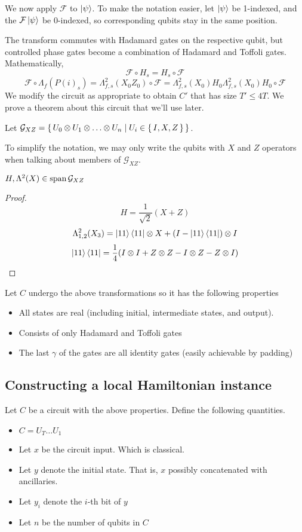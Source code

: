We now apply $\mathcal{F}$ to $\ket\psi$. To make the notation easier, let $\ket{\psi}$ be 1-indexed, and the $\mathcal{F}\ket{\psi}$ be 0-indexed, so corresponding qubits stay in the same position.

The transform commutes with Hadamard gates on the respective qubit, but controlled phase gates become a combination of Hadamard and Toffoli gates. Mathematically,
$$\mathcal{F}\circ H_s=H_s\circ\mathcal{F}$$
$$\mathcal{F}\circ\Lambda_f(P(i)_s)=\Lambda^2_{f,s}(X_0Z_0)\circ\mathcal{F}=\Lambda^2_{f,s}(X_0)H_0\Lambda^2_{f,s}(X_0)H_0\circ\mathcal{F}$$
We modify the circuit as appropriate to obtain $C'$ that has size $T'\leq 4T$. We prove a theorem about this circuit that we'll use later.

\begin{definition}
	Let $\mathcal{G}_{XZ}=\set{U_0\otimes U_1\otimes\ldots\otimes U_n|U_i\in\set{I,X,Z}}$.
\end{definition}

To simplify the notation, we may only write the qubits with $X$ and $Z$ operators when talking about members of $\mathcal{G}_{XZ}$.

\begin{theorem}
	$H,\Lambda^2(X)\in\operatorname*{\operatorname{span}}\mathcal{G}_{XZ}$
\end{theorem}

\begin{proof}
	$$H=\frac{1}{\sqrt{2}}(X+Z)$$
	$$\Lambda^2_{1,2}(X_3)=\ket{11}\bra{11}\otimes X+(I-\ket{11}\bra{11})\otimes I$$
	$$\ket{11}\bra{11}=\frac{1}{4}(I\otimes I+Z\otimes Z-I\otimes Z-Z\otimes I)$$
\end{proof}

Let $C$ undergo the above transformations so it has the following properties
\begin{itemize}
	\item All states are real (including initial, intermediate states, and output).
	\item Consists of only Hadamard and Toffoli gates
	\item The last $\gamma$ of the gates are all identity gates (easily achievable by padding)
\end{itemize}

\subsection{Constructing a local Hamiltonian instance}

Let $C$ be a circuit with the above properties. Define the following quantities.
\begin{itemize}
	\item $C=U_T\ldots U_1$
	\item Let $x$ be the circuit input. Which is classical.
	\item Let $y$ denote the initial state. That is, $x$ possibly concatenated with ancillaries.
	\item Let $y_i$ denote the $i$-th bit of $y$
	\item Let $n$ be the number of qubits in $C$
\end{itemize}

